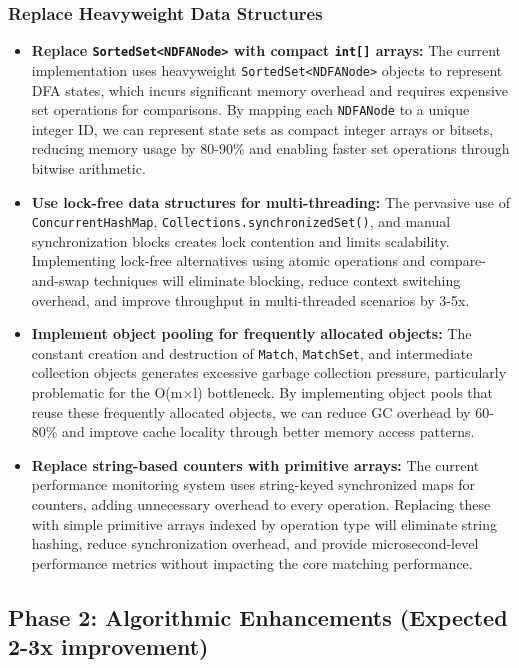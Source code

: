 \documentclass[11pt,a4paper]{article}
\begin{document}
\subsubsection{Replace Heavyweight Data Structures}

\begin{itemize}
\item \textbf{Replace \texttt{SortedSet<NDFANode>} with compact \texttt{int[]} arrays:} The current implementation uses heavyweight \texttt{SortedSet<NDFANode>} objects to represent DFA states, which incurs significant memory overhead and requires expensive set operations for comparisons. By mapping each \texttt{NDFANode} to a unique integer ID, we can represent state sets as compact integer arrays or bitsets, reducing memory usage by 80-90\% and enabling faster set operations through bitwise arithmetic.

\item \textbf{Use lock-free data structures for multi-threading:} The pervasive use of \texttt{ConcurrentHashMap}, \texttt{Collections.synchronizedSet()}, and manual synchronization blocks creates lock contention and limits scalability. Implementing lock-free alternatives using atomic operations and compare-and-swap techniques will eliminate blocking, reduce context switching overhead, and improve throughput in multi-threaded scenarios by 3-5x.

\item \textbf{Implement object pooling for frequently allocated objects:} The constant creation and destruction of \texttt{Match}, \texttt{MatchSet}, and intermediate collection objects generates excessive garbage collection pressure, particularly problematic for the O(m×l) bottleneck. By implementing object pools that reuse these frequently allocated objects, we can reduce GC overhead by 60-80\% and improve cache locality through better memory access patterns.

\item \textbf{Replace string-based counters with primitive arrays:} The current performance monitoring system uses string-keyed synchronized maps for counters, adding unnecessary overhead to every operation. Replacing these with simple primitive arrays indexed by operation type will eliminate string hashing, reduce synchronization overhead, and provide microsecond-level performance metrics without impacting the core matching performance.
\end{itemize}

\subsection{Phase 2: Algorithmic Enhancements (Expected 2-3x improvement)}
\end{document}
